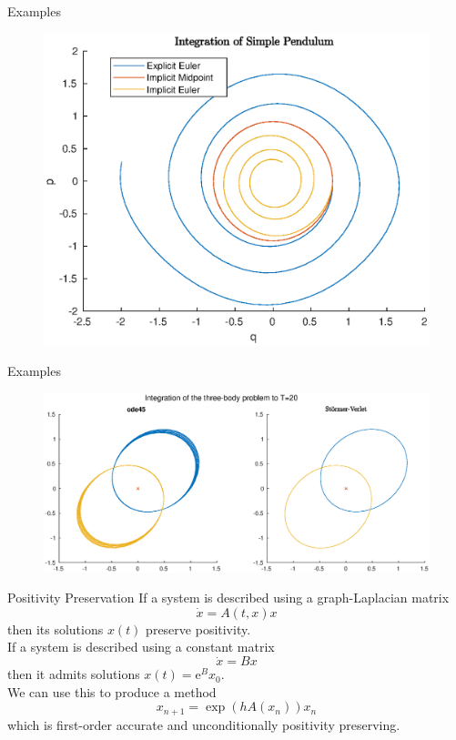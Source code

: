 \documentclass[aspectratio=169]{beamer}
\begin{document}
\begin{frame}{Examples}
	\begin{figure}
		\centering
		\includegraphics[height=0.7\textheight]{figures/pendulum.eps}
		\label{fig:pendulum}
	\end{figure}
\end{frame}

\begin{frame}{Examples}
	\begin{figure}
		\centering
		\includegraphics[width=\linewidth]{Matlab/threebodyorbit}
		\label{fig:threebody}
	\end{figure}
\end{frame}

\begin{frame}{Positivity Preservation}
	If a system is described using a graph-Laplacian matrix
	\begin{equation*}
		\dot{x} = A(t,x)x
	\end{equation*}
	then its solutions $x(t)$ preserve positivity. \\ \pause
	If a system is described using a constant matrix 
	\begin{equation*}
		\dot{x} = Bx
	\end{equation*}
	then it admits solutions $x(t) = \mathrm{e}^B x_0$. \\ \pause
	We can use this to produce a method
	\begin{equation*}
		x_{n+1} = \exp(h A(x_n)) x_n
	\end{equation*}
	which is first-order accurate and unconditionally positivity preserving.
\end{frame}
\end{document}
